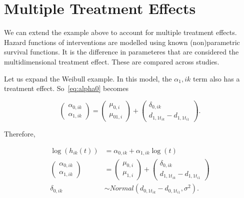 \section{Multiple Treatment Effects}

We can extend the example above to account for multiple treatment effects. Hazard functions of interventions are modelled using known (non)parametric survival functions. It is the difference in parameteres that are considered the multidimensional treatment effect. These are compared across studies. 

Let us expand the Weibull example. In this model, the $\alpha_1,ik$ term also has a treatment effect. So~\ref{eq:alpha0} becomes 

\begin{equation}
     \begin{pmatrix}
          \alpha_{0,ik} \\
          \alpha_{1,ik} 
     \end{pmatrix}   
     =
     \begin{pmatrix}
          \mu_{0,i} \\
          \mu_{01,i}
     \end{pmatrix} 
     +
     \begin{pmatrix}
          \delta_{0,ik} \\
          d_{1,1t_{ik}} - d_{1,1t_{i1}}
     \end{pmatrix}.
\end{equation}

Therefore, 

\begin{align}
     \log(h_{ik}(t)) &= \alpha_{0,ik} + \alpha_{1,ik}\log(t) \label{weibNMA} \\
     \begin{pmatrix}
          \alpha_{0,ik} \\
          \alpha_{1,ik} 
     \end{pmatrix}   
     &=
     \begin{pmatrix}
          \mu_{0,i} \\
          \mu_{1,i}
     \end{pmatrix} 
     +
     \begin{pmatrix}
          \delta_{0,ik} \\
          d_{1,1t_{ik}} - d_{1,1t_{i1}}
     \end{pmatrix} \\
     \delta_{0,ik} &\sim Normal(d_{0,1t_{ik}}-d_{0,1t_{i1}}, \sigma^2). 
\end{align}

